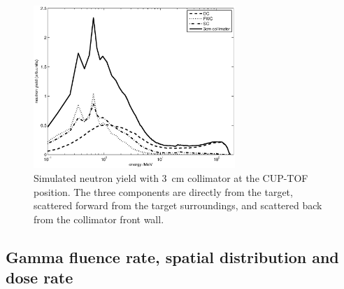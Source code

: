 \documentclass[12pt,journal]{IEEEtran}
\let\MYoriglatexcaption\caption
\renewcommand{\caption}[2][\relax]{\MYoriglatexcaption[#2]{#2}}
\begin{document}
\begin{figure}[!t]
	\centering
	\includegraphics[width=3in]{TOF3Componentslinear.eps}
	\caption{
    Simulated neutron yield with \SI{3}{\cm} collimator at the CUP-TOF position.
    The three components are directly from the target, scattered forward from the target surroundings, and scattered back from the collimator front wall.}
	\label{fig:TOF3Componentslinear}
\end{figure}

\subsection{Gamma fluence rate, spatial distribution and dose rate}
\end{document}
